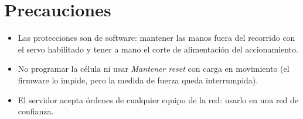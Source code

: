 \section{Precauciones}
\begin{itemize}
  \item Las protecciones son de software: mantener las manos fuera del recorrido con el servo
        habilitado y tener a mano el corte de alimentación del accionamiento.
  \item No programar la célula ni usar \emph{Mantener reset} con carga en movimiento (el firmware lo
        impide, pero la medida de fuerza queda interrumpida).
  \item El servidor acepta órdenes de cualquier equipo de la red: usarlo en una red de confianza.
\end{itemize}
